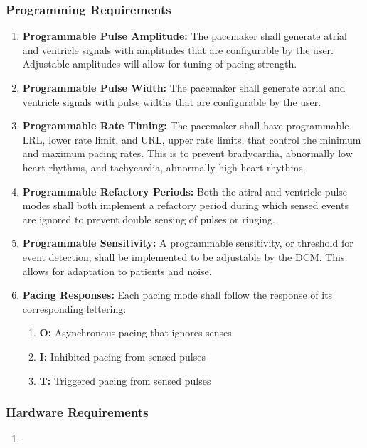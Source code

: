 \documentclass{article}
\begin{document}
\subsubsection{Programming Requirements}

\begin{enumerate}[label=]
    \item \textbf{Programmable Pulse Amplitude:} The pacemaker shall generate atrial and ventricle signals with amplitudes 
    that are configurable by the user. Adjustable amplitudes will allow for tuning of pacing strength.
    \item \textbf{Programmable Pulse Width:} The pacemaker shall generate atrial and ventricle signals with pulse widths 
    that are configurable by the user. 
    \item \textbf{Programmable Rate Timing:} The pacemaker shall have programmable LRL, lower rate limit, and URL,
    upper rate limits, that control the minimum and maximum pacing rates. This is to prevent bradycardia, abnormally low heart rhythms,
    and tachycardia, abnormally high heart rhythms. 
    \item \textbf{Programmable Refactory Periods:} Both the atiral and ventricle pulse modes shall both implement a 
    refactory period during which sensed events are ignored to prevent double sensing of pulses or ringing. 
    \item \textbf{Programmable Sensitivity:} A programmable sensitivity, or threshold for event detection, shall be implemented 
    to be adjustable by the DCM. This allows for adaptation to patients and noise. 
    \item \textbf{Pacing Responses:} Each pacing mode shall follow the response of its corresponding lettering:
    \begin{enumerate}[label=]
        \item \textbf{O:} Asynchronous pacing that ignores senses
        \item \textbf{I:} Inhibited pacing from sensed pulses
        \item \textbf{T:} Triggered pacing from sensed pulses
    \end{enumerate}
\end{enumerate}

\subsubsection{Hardware Requirements}

\begin{enumerate}[label=]
    \item \textbf{}
\end{enumerate}
\end{document}
